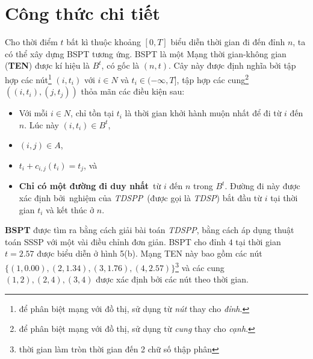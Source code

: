 \documentclass[../main.tex]{subfiles}
\begin{document}
\section{Công thức chi tiết}\label{cong-thuc1}

Cho thời điểm \(t\) bất kì thuộc khoảng \([0, T]\) biểu diễn thời gian
đi đến đỉnh \(n\), ta có thể xây dựng BSPT tương ứng. BSPT là một Mạng
thời gian-không gian (\textbf{TEN}) được kí hiệu là \(B^t\), có gốc là
\((n, t)\). Cây này được định nghĩa bởi tập hợp các nút\footnote{để phân
  biệt mạng với đồ thị, sử dụng từ \emph{nút} thay cho \emph{đỉnh}.} \((i, t_i)\)
với \(i \in N\) và \(t_i \in (-\infty, T]\), tập hợp các cung\footnote{để
  phân biệt mạng với đồ thị, sử dụng từ \emph{cung} thay cho \emph{cạnh}.}
\(((i, t_i), (j, t_j))\) thỏa mãn các điều kiện sau: 

\begin{itemize}
\tightlist
\item
  Với mỗi \(i\in N\), chỉ tồn tại \(t_i\) là thời gian khởi hành muộn
  nhất để đi từ \(i\) đến \(n\). Lúc này \((i, t_i)\in B^t\),
\item
  \((i, j) \in A\),
\item
  \(t_i + c_{i, j}(t_i) = t_j\), và
\item
  \textbf{Chỉ có một đường đi duy nhất}~từ \(i\) đến \(n\) trong
  \(B^t\). Đường đi này được xác định bởi~nghiệm của \emph{TDSPP}~(được
  gọi là \emph{TDSP}) bắt đầu từ \(i\) tại thời gian \(t_i\) và kết thúc
  ở \(n\).
\end{itemize}

\textbf{BSPT} được tìm ra
bằng cách giải bài toán \emph{TDSPP}, bằng cách áp dụng thuật toán SSSP
với một vài điều chỉnh đơn giản. BSPT cho đỉnh \(4\) tại thời gian
\(t=2.57\) được biểu diễn ở hình 5(b). Mạng TEN này bao gồm các nút
\(\{(1, 0.00), (2, 1.34), (3, 1.76), (4, 2.57)\}\)\footnote{thời gian
  làm tròn thời gian đến 2 chữ số thập phân} và các cung
\((1, 2), (2, 4), (3, 4)\) được xác định bởi các nút theo thời gian.
\end{document}

